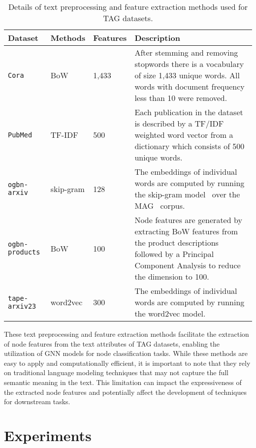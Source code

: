 \documentclass{article}
\begin{document}
\begin{table}[!ht]
\caption{Details of text preprocessing and feature extraction methods used for TAG datasets.}
\small
    \label{tab: text preprocess}
    \centering
    \begin{tabularx}{\textwidth}{lllX}
    \toprule
         Dataset  &Methods & Features & Description \\
         \midrule
         \texttt{Cora}
         & BoW
         & 1,433
         & After stemming and removing stopwords there is a vocabulary of size 1,433 unique words. All words with document frequency less than 10 were removed.\\
\midrule
         \texttt{PubMed} 
         & TF-IDF
         & 500
         & Each publication in the dataset is described by a TF/IDF weighted word vector from a dictionary which consists of 500 unique words. \\
         \midrule
         \texttt{ogbn-arxiv}
         & skip-gram
         & 128
         & The embeddings of individual words are computed by running the skip-gram model~\citep{mikolov2013distributed_skipgram} over the MAG~\citep{wang2020microsoft_mag} corpus.\\
         \midrule
         \texttt{ogbn-products} 
         & BoW
         & 100
         & Node features are generated by extracting BoW features from the product descriptions followed by a Principal Component Analysis to reduce the dimension to 100.
         \\
         \midrule
         \texttt{tape-arxiv23}
         & word2vec
         & 300
         & The embeddings of individual words are computed by running the word2vec model.
         \\
         \bottomrule
    \end{tabularx}
\end{table}

These text preprocessing and feature extraction methods facilitate the extraction of node features from the text attributes of TAG datasets, enabling the utilization of GNN models for node classification tasks. While these methods are easy to apply and computationally efficient, it is important to note that they rely on traditional language modeling techniques that may not capture the full semantic meaning in the text. This limitation can impact the expressiveness of the extracted node features and potentially affect the development of techniques for downstream tasks.


\section{Experiments}\label{app sec: experiment}
\end{document}
